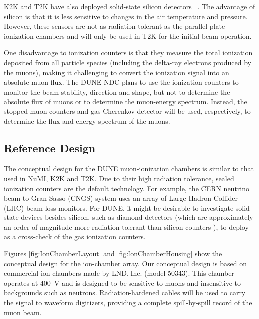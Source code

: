 K2K and T2K have also
deployed solid-state silicon detectors~\cite{ref:Maruyama}
\cite{ref:RD42A}. The advantage of silicon is that it is less
sensitive to changes in the air temperature and pressure. However, these %
sensors are not as radiation-tolerant as the parallel-plate ionization 
chambers and will only be used in T2K for the initial
beam operation. 

One disadvantage to ionization counters is that they
measure the total ionization deposited from all particle species
(including the delta-ray electrons produced by the muons), making it
challenging to convert the ionization signal into an absolute
muon flux. The DUNE NDC plans to use the ionization counters to monitor
the beam stability, direction and shape, 
but not to determine the
absolute flux of muons or to determine the muon-energy spectrum. Instead, the
stopped-muon counters %
and gas Cherenkov detector %
 will be used, respectively, to determine the flux and energy
spectrum of the muons. 

\subsection{Reference Design}

The conceptual design for the DUNE muon-ionization chambers is similar
to that used in NuMI, K2K and T2K.  Due to their high radiation
tolerance, sealed ionization counters are the default technology.  For
example, the CERN neutrino beam to Gran Sasso (CNGS) 
system uses an array of Large Hadron Collider (LHC) 
 beam-loss monitors. For DUNE, it might be desirable to investigate solid-state devices
besides silicon, such as diamond detectors (which are approximately an
order of magnitude more radiation-tolerant than silicon counters
\cite{ref:RD42A}\cite{ref:K2KMuDecayMon} ), to deploy as a cross-check of the gas
ionization counters.

Figures \ref{fig:IonChamberLayout} and \ref{fig:IonChamberHousing}
show the conceptual design for the ion-chamber array. Our conceptual
design is based on commercial ion chambers made by LND, Inc. (model 50343). 
This chamber operates at 400~V and is designed to be sensitive to muons and insensitive to 
backgrounds such as neutrons. 
Radiation-hardened cables will be used to carry the signal to waveform
digitizers, providing a complete spill-by-spill record of the
muon beam.

